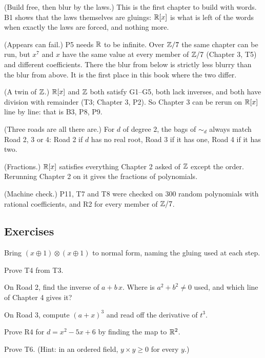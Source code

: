 \begin{lines}
\item[\lab{R1}] (Build free, then blur by the laws.) This is the first chapter to build with words. B1 shows that the laws themselves are gluings: $\mathbb{R}[x]$ is what is left of the words when exactly the laws are forced, and nothing more.
\item[\lab{R2}] (Appears can fail.) P5 needs $\mathbb{R}$ to be infinite. Over $\mathbb{Z}/7$ the same chapter can be run, but $x^7$ and $x$ have the same value at every member of $\mathbb{Z}/7$ (Chapter 3, T5) and different coefficients. There the blur from below is strictly less blurry than the blur from above. It is the first place in this book where the two differ.
\item[\lab{R3}] (A twin of $\mathbb{Z}$.) $\mathbb{R}[x]$ and $\mathbb{Z}$ both satisfy G1--G5, both lack inverses, and both have division with remainder (T3; Chapter 3, P2). So Chapter 3 can be rerun on $\mathbb{R}[x]$ line by line: that is B3, P8, P9.
\item[\lab{R4}] (Three roads are all there are.) For $d$ of degree $2$, the bags of $\sim_d$ always match Road 2, 3 or 4: Road 2 if $d$ has no real root, Road 3 if it has one, Road 4 if it has two.
\item[\lab{R5}] (Fractions.) $\mathbb{R}[x]$ satisfies everything Chapter 2 asked of $\mathbb{Z}$ except the order. Rerunning Chapter 2 on it gives the fractions of polynomials.
\item[\lab{R6}] (Machine check.) P11, T7 and T8 were checked on 300 random polynomials with rational coefficients, and R2 for every member of $\mathbb{Z}/7$.
\end{lines}

\subsection*{Exercises}

\begin{lines}
\item[\lab{E1}] Bring $(x \oplus 1) \otimes (x \oplus 1)$ to normal form, naming the gluing used at each step.
\item[\lab{E2}] Prove T4 from T3.
\item[\lab{E3}] On Road 2, find the inverse of $a + b\,x$. Where is $a^2 + b^2 \neq 0$ used, and which line of Chapter 4 gives it?
\item[\lab{E4}] On Road 3, compute $(a + x)^3$ and read off the derivative of $t^3$.
\item[\lab{E5}] Prove R4 for $d = x^2 - 5x + 6$ by finding the map to $\mathbb{R}^2$.
\item[\lab{E6}] Prove T6. (Hint: in an ordered field, $y \times y \ge 0$ for every $y$.)
\end{lines}

